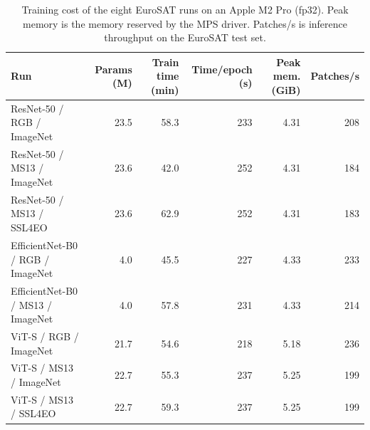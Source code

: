 \begin{table}[t]
\centering
\footnotesize
\caption{Training cost of the eight EuroSAT runs on an Apple M2 Pro (fp32). Peak memory is the memory reserved by the MPS driver. Patches/s is inference throughput on the EuroSAT test set.}
\label{tab:cost}
\begin{tabular}{lrrrrr}
\toprule
Run & Params (M) & Train time (min) & Time/epoch (s) & Peak mem. (GiB) & Patches/s \\
\midrule
ResNet-50 / RGB / ImageNet & 23.5 & 58.3 & 233 & 4.31 & 208 \\
ResNet-50 / MS13 / ImageNet & 23.6 & 42.0 & 252 & 4.31 & 184 \\
ResNet-50 / MS13 / SSL4EO & 23.6 & 62.9 & 252 & 4.31 & 183 \\
EfficientNet-B0 / RGB / ImageNet & 4.0 & 45.5 & 227 & 4.33 & 233 \\
EfficientNet-B0 / MS13 / ImageNet & 4.0 & 57.8 & 231 & 4.33 & 214 \\
ViT-S / RGB / ImageNet & 21.7 & 54.6 & 218 & 5.18 & 236 \\
ViT-S / MS13 / ImageNet & 22.7 & 55.3 & 237 & 5.25 & 199 \\
ViT-S / MS13 / SSL4EO & 22.7 & 59.3 & 237 & 5.25 & 199 \\
\bottomrule
\end{tabular}
\end{table}
